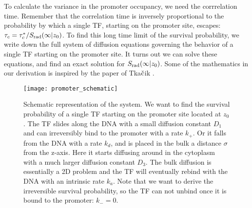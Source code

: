 To calculate the variance in the promoter occupancy, we need the corrrelation time. Remember that the correlation time is inversely proportional to the probability by which a single TF, starting on the promoter site, escapes: $\tau_c = \tau_c^* / S_{\rm rad}(\infty|z_0)$. To find this long time limit of the survival probability, we write down the full system of diffusion equations governing the behavior of a single TF starting on the promoter site. It turns out we can solve these equations, and find an exact solution for $S_{\rm rad}(\infty|z_0)$. Some of the mathematics in our derivation is inspired by the paper of Tka$\check{\rm c}$ik \cite{Tkacik2009}. 

\begin{figure}[ht]
\centering
\texttt{[image: promoter\_schematic]}
\caption{ Schematic representation of the system. We want to find the survival probability of a single TF starting on the promoter site located at $z_0$. The TF slides along the DNA with a small diffusion constant $D_1$ and can irreversibly bind to the promoter with a rate $k_+$. Or it falls from the DNA with a rate $k_d$, and is placed in the bulk a distance $\sigma$ from the z-axis. Here it starts diffusing around in the cytoplasm with a much larger diffusion constant $D_3$. The bulk diffusion is essentially a 2D problem and the TF will eventually rebind with the DNA with an intrinsic rate $k_a$. Note that we want to derive the irreversible survival probability, so the TF can not unbind once it is bound to the promoter: $k_- = 0$.}
\end{figure}

